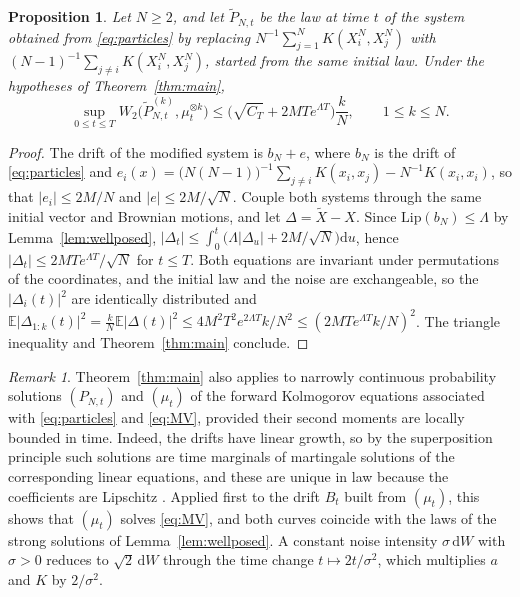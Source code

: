 \documentclass[11pt]{amsart}
\numberwithin{equation}{section}
\theoremstyle{plain}
\newtheorem{proposition}[theorem]{Proposition}
\theoremstyle{remark}
\newtheorem{remark}[theorem]{Remark}
\newcommand{\E}{\mathbb{E}}
\newcommand{\W}{W_2}
\newcommand{\Lip}{\mathrm{Lip}}
\newcommand{\dd}{\mathrm{d}}
\begin{document}
\begin{proposition}\label{prop:offdiag}
Let $N\ge2$, and let $\tilde P_{N,t}$ be the law at time $t$ of the system obtained from \eqref{eq:particles} by replacing $N^{-1}\sum_{j=1}^NK(X^N_i,X^N_j)$ with $(N-1)^{-1}\sum_{j\ne i}K(X^N_i,X^N_j)$, started from the same initial law. Under the hypotheses of Theorem~\ref{thm:main},
\[
\sup_{0\le t\le T}\W\big(\tilde P^{(k)}_{N,t},\mu_t^{\otimes k}\big)\le\big(\sqrt{C_T}+2MTe^{\Lambda T}\big)\frac kN,\qquad 1\le k\le N.
\]
\end{proposition}

\begin{proof}
The drift of the modified system is $b_N+e$, where $b_N$ is the drift of \eqref{eq:particles} and $e_i(x)=\big(N(N-1)\big)^{-1}\sum_{j\ne i}K(x_i,x_j)-N^{-1}K(x_i,x_i)$, so that $|e_i|\le2M/N$ and $|e|\le2M/\sqrt N$. Couple both systems through the same initial vector and Brownian motions, and let $\Delta=\tilde X-X$. Since $\Lip(b_N)\le\Lambda$ by Lemma~\ref{lem:wellposed}, $|\Delta_t|\le\int_0^t\big(\Lambda|\Delta_u|+2M/\sqrt N\big)\dd u$, hence $|\Delta_t|\le2MTe^{\Lambda T}/\sqrt N$ for $t\le T$. Both equations are invariant under permutations of the coordinates, and the initial law and the noise are exchangeable, so the $|\Delta_i(t)|^2$ are identically distributed and $\E|\Delta_{1:k}(t)|^2=\frac kN\E|\Delta(t)|^2\le4M^2T^2e^{2\Lambda T}k/N^2\le(2MTe^{\Lambda T}k/N)^2$. The triangle inequality and Theorem~\ref{thm:main} conclude.
\end{proof}

\begin{remark}\label{rem:weak}
Theorem~\ref{thm:main} also applies to narrowly continuous probability solutions $(P_{N,t})$ and $(\mu_t)$ of the forward Kolmogorov equations associated with \eqref{eq:particles} and \eqref{eq:MV}, provided their second moments are locally bounded in time. Indeed, the drifts have linear growth, so by the superposition principle \cite{Tre16,BRS21} such solutions are time marginals of martingale solutions of the corresponding linear equations, and these are unique in law because the coefficients are Lipschitz \cite[Sections~5.2--5.4]{KS91}. Applied first to the drift $B_t$ built from $(\mu_t)$, this shows that $(\mu_t)$ solves \eqref{eq:MV}, and both curves coincide with the laws of the strong solutions of Lemma~\ref{lem:wellposed}. A constant noise intensity $\sigma\,\dd W$ with $\sigma>0$ reduces to $\sqrt2\,\dd W$ through the time change $t\mapsto2t/\sigma^2$, which multiplies $a$ and $K$ by $2/\sigma^2$.
\end{remark}
\end{document}
